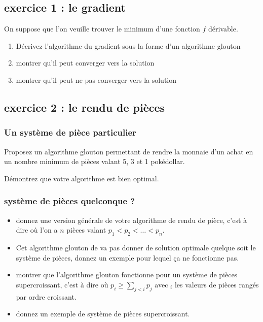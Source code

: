 \documentclass[
]{article}
\providecommand{\tightlist}{%
  \setlength{\itemsep}{0pt}\setlength{\parskip}{0pt}}
\begin{document}
\hypertarget{exercice-1-le-gradient}{%
\subsection{exercice 1 : le gradient}\label{exercice-1-le-gradient}}

On suppose que l'on veuille trouver le minimum d'une fonction \(f\)
dérivable.

\begin{enumerate}
\def\labelenumi{\arabic{enumi}.}
\tightlist
\item
  Décrivez l'algorithme du gradient sous la forme d'un algorithme
  glouton
\item
  montrer qu'il peut converger vers la solution
\item
  montrer qu'il peut ne pas converger vers la solution
\end{enumerate}

\hypertarget{exercice-2-le-rendu-de-piuxe8ces}{%
\subsection{exercice 2 : le rendu de
pièces}\label{exercice-2-le-rendu-de-piuxe8ces}}

\hypertarget{un-systuxe8me-de-piuxe8ce-particulier}{%
\subsubsection{Un système de pièce
particulier}\label{un-systuxe8me-de-piuxe8ce-particulier}}

Proposez un algorithme glouton permettant de rendre la monnaie d'un
achat en un nombre minimum de pièces valant 5, 3 et 1 pokédollar.

Démontrez que votre algorithme est bien optimal.

\hypertarget{systuxe8me-de-piuxe8ces-quelconque}{%
\subsubsection{système de pièces quelconque
?}\label{systuxe8me-de-piuxe8ces-quelconque}}

\begin{itemize}
\tightlist
\item
  donnez une version générale de votre algorithme de rendu de pièce,
  c'est à dire où l'on a \(n\) pièces valant
  \(p_1 < p_2 < \dots < p_n\).
\item
  Cet algorithme glouton de va pas donner de solution optimale quelque
  soit le système de pièces, donnez un exemple pour lequel ça ne
  fonctionne pas.
\item
  montrer que l'algorithme glouton fonctionne pour un système de pièces
  supercroissant, c'est à dire où \(p_i \geq \sum_{j< i} p_j\) avec
  \(_i\) les valeurs de pièces rangés par ordre croissant.
\item
  donnez un exemple de système de pièces supercroissant.
\end{itemize}
\end{document}
